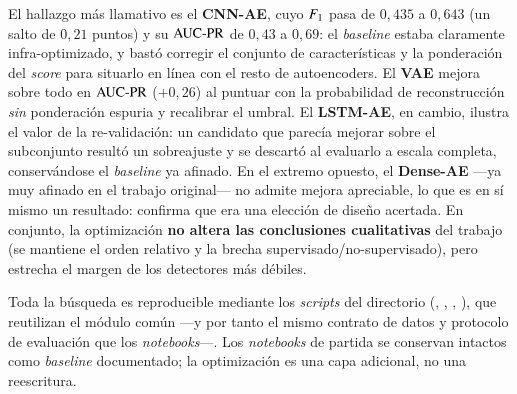 El hallazgo más llamativo es el \textbf{CNN-AE}, cuyo $F_{1}$ pasa de $0{,}435$ a
$0{,}643$ (un salto de $0{,}21$ puntos) y su $\text{AUC-PR}$ de $0{,}43$ a $0{,}69$: el
\emph{baseline} estaba claramente infra-optimizado, y bastó corregir el conjunto
de características y la ponderación del \emph{score} para situarlo en línea con el
resto de autoencoders. El \textbf{VAE} mejora sobre todo en $\text{AUC-PR}$ ($+0{,}26$)
al puntuar con la probabilidad de reconstrucción \emph{sin} ponderación espuria y
recalibrar el umbral. El \textbf{LSTM-AE}, en cambio, ilustra el valor de la re-validación: un candidato
que parecía mejorar sobre el subconjunto resultó un sobreajuste y se descartó al
evaluarlo a escala completa, conservándose el \emph{baseline} ya afinado. En el extremo opuesto,
el \textbf{Dense-AE} ---ya muy afinado en el trabajo original--- no admite mejora
apreciable, lo que es en sí mismo un resultado: confirma que era una elección de
diseño acertada. En conjunto, la optimización \textbf{no altera las conclusiones
cualitativas} del trabajo (se mantiene el orden relativo y la brecha
supervisado/no-supervisado), pero estrecha el margen de los detectores más
débiles.

\begin{observacion}[Reproducibilidad]
Toda la búsqueda es reproducible mediante los \emph{scripts} del directorio
 (, ,
, ), que reutilizan el módulo común
 ---y por tanto el mismo contrato de datos y protocolo de
evaluación que los \emph{notebooks}---. Los \emph{notebooks} de partida se
conservan intactos como \emph{baseline} documentado; la optimización es una capa
adicional, no una reescritura.
\end{observacion}

